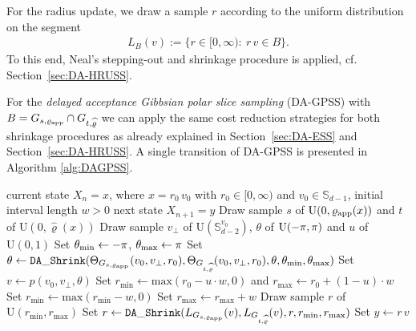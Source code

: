 \documentclass[sn-mathphys-num]{sn-jnl}%
\theoremstyle{thmstyleone}%
\theoremstyle{thmstyletwo}%
\theoremstyle{thmstylethree}%
\newcommand{\rhoapp}{\varrho_{{\rm app}}}
\newcommand{\change}[1]{\bgroup\color{black}#1\egroup}    %
\begin{document}
For the radius update, we draw a sample $r$ according to the uniform distribution on the segment 
\begin{align}\label{segment:gpss}
    L_{B}(v):=\{r \in [0, \infty)\colon \ r\, v \in B \}.
\end{align}
To this end, Neal’s stepping-out and shrinkage procedure \cite{Neal2003} is applied, cf. Section~\ref{sec:DA-HRUSS}.


For the \emph{delayed acceptance Gibbsian polar slice sampling} (DA-GPSS) with $B = G_{s,\rhoapp} \cap G_{t,\widehat{\varrho}}$ we can apply the same cost reduction strategies for both shrinkage procedures as already explained in Section~\ref{sec:DA-ESS} and Section~\ref{sec:DA-HRUSS}. 
A single transition of DA-GPSS is presented in Algorithm \ref{alg:DAGPSS}.

\begin{algorithm}
	\caption{Delayed Acceptance Gibbsian Polar Slice Sampling}\label{alg:DAGPSS}
	\renewcommand{\algorithmicrequire}{\textbf{Input:}}
	\renewcommand{\algorithmicensure}{\textbf{Output:}}
	\begin{algorithmic}[1]
		\Require current state $X_n = x$, where $x = r_0\, v_0$ with $r_{0}\in[0,\infty)$ and $v_{0} \in \mathbb{S}_{d-1}$, initial interval length $w>0$ 
		\Ensure next state $X_{n+1} = y$
		\State Draw sample $s$ of $\mathrm{U}(0,\rhoapp(x))$ and $t$ of $\mathrm{U}(0,\widehat{\varrho}(x))$
        \State Draw sample $v_\perp$ of $\mathrm{U}(\mathbb{S}^{v_0}_{d-2})$, $\theta$ of $\change{\mathrm{U}(-\pi,\pi)}$ and $u$ of $\mathrm{U}(0,1)$  
		\State Set $\theta_{\text{min}} \leftarrow \change{-\pi}$, $\theta_{\text{max}}\leftarrow \change{\pi}$
        \State Set $\theta \leftarrow \mathtt{DA\text{\_}Shrink}(\Theta_{G_{s,\rhoapp}}(v_0,v_\perp, r_0), \Theta_{G_{t,\widehat{\varrho}}}(v_0,v_\perp, r_0), \theta, \theta_{\text{min}}, \theta_{\text{max}})$
        \State Set $v \leftarrow p(v_0, v_\perp, \theta)$
        \State Set $r_\text{min} \leftarrow \text{max}(r_0-u\cdot w, 0)$ and $r_\text{max} \leftarrow r_0+(1-u)\cdot w$
        \State Set $r_\text{min} \leftarrow \text{max}(r_\text{min} - w, 0)$
		\EndWhile
        \State Set $r_\text{max} \leftarrow  r_\text{max} + w$
        \EndWhile
        \State Draw sample $r$ of $\mathrm{U}(r_\text{min},r_\text{max})$
        \State Set $r \leftarrow \mathtt{DA\text{\_}Shrink}(L_{G_{s,\rhoapp}}(v), L_{G_{t,\widehat{\varrho}}}(v), r, r_\text{min}, r_\text{max})$
		\State Set $y \leftarrow r \, v$
	\end{algorithmic}
\end{algorithm}
\end{document}
